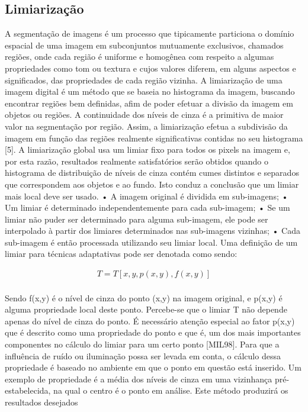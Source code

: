 \documentclass[
	article,			%
	11pt,				%
	oneside,			%
	a4paper,			%
	english,			%
	brazil,				%
	sumario=tradicional
	]{abntex2}
\begin{document}
\subsection{Limiarização}
        A segmentação de imagens é um processo que tipicamente particiona o
domínio espacial de uma imagem em subconjuntos mutuamente exclusivos,
chamados regiões, onde cada região é uniforme e homogênea com respeito a algumas
propriedades como tom ou textura e cujos valores diferem, em alguns aspectos e
significados, das propriedades de cada região vizinha.
       A limiarização de uma imagem digital é um método que se baseia no
histograma da imagem, buscando encontrar regiões bem definidas, afim de poder
efetuar a divisão da imagem em objetos ou regiões. A continuidade dos níveis de
cinza é a primitiva de maior valor na segmentação por região. Assim, a limiarização
efetua a subdivisão da imagem em função das regiões realmente significativas
contidas no seu histograma [5].
        A limiarização global usa um limiar fixo para todos os pixels na imagem e, por
esta razão, resultados realmente satisfatórios serão obtidos quando o histograma de
distribuição de níveis de cinza contém cumes distintos e separados que
correspondem aos objetos e ao fundo. Isto conduz a conclusão que um limiar mais
local deve ser usado. 
• A imagem original é dividida em sub-imagens;\newline
• Um limiar é determinado independentemente para cada sub-imagem;\newline
• Se um limiar não puder ser determinado para alguma sub-imagem, ele
  pode ser interpolado à partir dos limiares determinados nas sub-imagens
  vizinhas;\newline
• Cada sub-imagem é então processada utilizando seu limiar local.
     Uma definição de um limiar para técnicas adaptativas pode ser denotada
como sendo:

\begin{align}
T=T[x,y,p(x,y),f(x,y)]
\end{align}
\\Sendo f(x,y) é o nível de cinza do ponto (x,y) na imagem original, e p(x,y) é
alguma propriedade local deste ponto. Percebe-se que o limiar T não depende
apenas do nível de cinza do ponto. É necessário atenção especial ao fator p(x,y) que
é descrito como uma propriedade do ponto e que é, um dos mais importantes
componentes no cálculo do limiar para um certo ponto [MIL98]. Para que a influência
de ruído ou iluminação possa ser levada em conta, o cálculo dessa propriedade é
baseado no ambiente em que o ponto em questão está inserido. Um exemplo de
propriedade é a média dos níveis de cinza em uma vizinhança pré-estabelecida, na
qual o centro é o ponto em análise. Este método produzirá os resultados desejados
\end{document}

